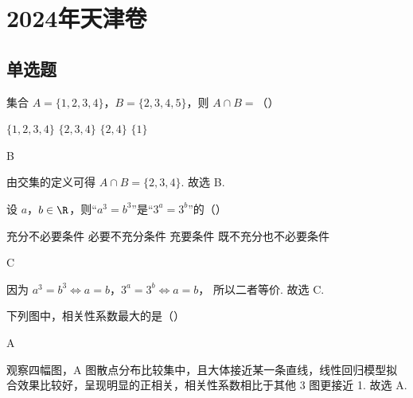 \chapter{2024年天津卷}

\section{单选题}

\begin{problem}
集合 \(A=\{1,2,3,4\}\)，\(B=\{2,3,4,5\}\)，则 \(A\cap B=\)（\quad）

\choices
    {\(\{1,2,3,4\}\)}
    {\(\{2,3,4\}\)}
    {\(\{2,4\}\)}
    {\(\{1\}\)}
\end{problem}

\begin{answer}
B
\end{answer}

\begin{solution}
由交集的定义可得
\(A\cap B=\{2,3,4\}\).
故选 B.
\end{solution}

\begin{problem}
设 \(a\)，\(b\in \R\)，则“\(a^3=b^3\)”是“\(3^a=3^b\)”的（\quad）

\choices
    {充分不必要条件}
    {必要不充分条件}
    {充要条件}
    {既不充分也不必要条件}
\end{problem}

\begin{answer}
C
\end{answer}

\begin{solution}
因为
\(a^3=b^3\Longleftrightarrow a=b\)，\(3^a=3^b\Longleftrightarrow a=b\)，
所以二者等价.
故选 C.
\end{solution}

\begin{problem}
下列图中，相关性系数最大的是（\quad）

    {}
    {}
    {}
\end{problem}

\begin{answer}
A
\end{answer}

\begin{solution}
观察四幅图，A 图散点分布比较集中，且大体接近某一条直线，线性回归模型拟合效果比较好，呈现明显的正相关，相关性系数相比于其他 3 图更接近 1.
故选 A.
\end{solution}

